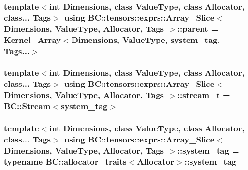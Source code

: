 \subsubsection[{\texorpdfstring{parent}{parent}}]{\setlength{\rightskip}{0pt plus 5cm}template$<$int Dimensions, class Value\+Type, class Allocator, class... Tags$>$ using {\bf B\+C\+::tensors\+::exprs\+::\+Array\+\_\+\+Slice}$<$ Dimensions, Value\+Type, {\bf Allocator}, Tags $>$\+::{\bf parent} =  {\bf Kernel\+\_\+\+Array}$<$Dimensions, Value\+Type, {\bf system\+\_\+tag}, Tags...$>$}\hypertarget{classBC_1_1tensors_1_1exprs_1_1Array__Slice_acabef76354e22bb269d63cec2cd501df}{}\label{classBC_1_1tensors_1_1exprs_1_1Array__Slice_acabef76354e22bb269d63cec2cd501df}
\subsubsection[{\texorpdfstring{stream\+\_\+t}{stream_t}}]{\setlength{\rightskip}{0pt plus 5cm}template$<$int Dimensions, class Value\+Type, class Allocator, class... Tags$>$ using {\bf B\+C\+::tensors\+::exprs\+::\+Array\+\_\+\+Slice}$<$ Dimensions, Value\+Type, {\bf Allocator}, Tags $>$\+::{\bf stream\+\_\+t} =  {\bf B\+C\+::\+Stream}$<${\bf system\+\_\+tag}$>$}\hypertarget{classBC_1_1tensors_1_1exprs_1_1Array__Slice_a5395d730cd39e49ff6695a3294b4be5f}{}\label{classBC_1_1tensors_1_1exprs_1_1Array__Slice_a5395d730cd39e49ff6695a3294b4be5f}
\subsubsection[{\texorpdfstring{system\+\_\+tag}{system_tag}}]{\setlength{\rightskip}{0pt plus 5cm}template$<$int Dimensions, class Value\+Type, class Allocator, class... Tags$>$ using {\bf B\+C\+::tensors\+::exprs\+::\+Array\+\_\+\+Slice}$<$ Dimensions, Value\+Type, {\bf Allocator}, Tags $>$\+::{\bf system\+\_\+tag} =  typename {\bf B\+C\+::allocator\+\_\+traits}$<${\bf Allocator}$>$\+::{\bf system\+\_\+tag}}\hypertarget{classBC_1_1tensors_1_1exprs_1_1Array__Slice_ae9aed80988883e25cc77cdd0e658a36e}{}\label{classBC_1_1tensors_1_1exprs_1_1Array__Slice_ae9aed80988883e25cc77cdd0e658a36e}


